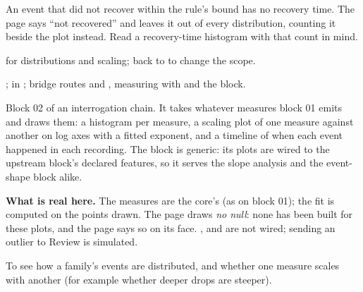 \begin{watchout}
An event that did not recover within the rule's bound has no recovery time. The page says ``not
recovered'' and leaves it out of every distribution, counting it beside the plot instead. Read a
recovery-time histogram with that count in mind.
\end{watchout}

 for distributions and scaling; back to
 to change the scope.

\begin{underthehood}
;  in
; bridge routes
 and , measuring with
 and the  block.
\end{underthehood}

Block 02 of an interrogation chain. It takes whatever measures block 01 emits and draws them:
a histogram per measure, a scaling plot of one measure against another on log axes with a fitted
exponent, and a timeline of when each event happened in each recording. The block is generic: its
plots are wired to the upstream block's declared features, so it serves the slope analysis and the
event-shape block alike.

\textbf{What is real here.} The measures are the core's (as on block 01); the fit is computed on
the points drawn. The page draws \emph{no null}: none has been built for these plots, and the page
says so on its face. ,  and  are not wired; sending an
outlier to Review is simulated.

To see how a family's events are distributed, and whether one measure scales with another (for
example whether deeper drops are steeper).


